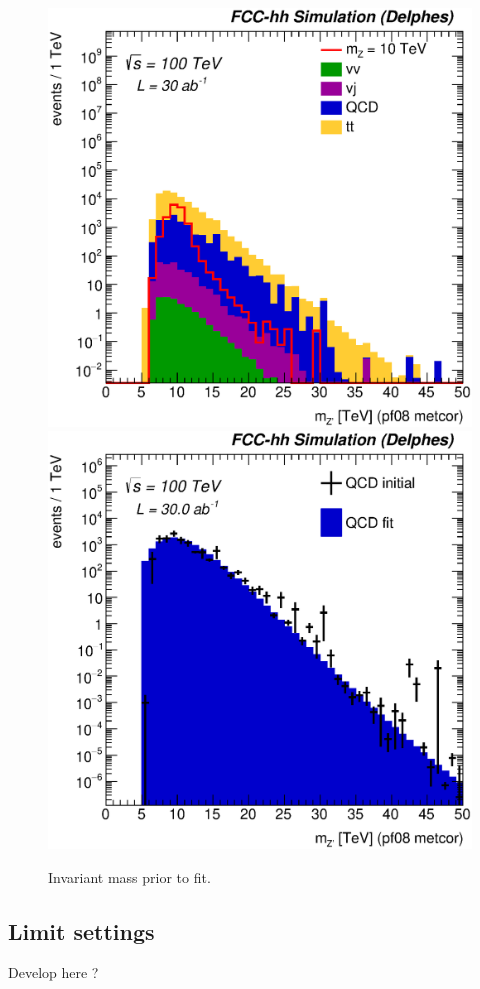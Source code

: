 \begin{figure}[!htb]\centering
\includegraphics[width=0.33\columnwidth]{Fig/Zptt/Mj1j2_pf08_MetCorr_sel8_nostack_log.eps}
\includegraphics[width=0.33\columnwidth]{Fig/Zptt/Zptt_QCD_sel8_Mj1j2_pf08_MetCorr_fit.eps}
\caption{Invariant mass prior to fit.}
\label{fig:hadronicresonances_nofit}
\end{figure}

\subsection{Limit settings}
\label{subsec:limitsettings}

Develop here ?
